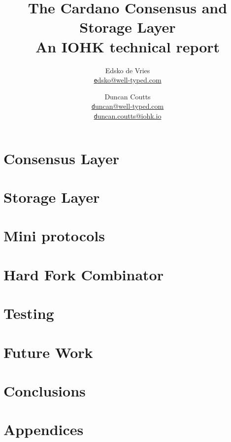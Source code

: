 \documentclass[11pt,a4paper]{report}
\title{The Cardano Consensus and Storage Layer \\
       {\large \sc An IOHK technical report}
  }
\author{Edsko de Vries \\ \href{mailto:edsko@well-typed.com}
                               {\small \texttt edsko@well-typed.com}
   \and Duncan Coutts  \\ \href{mailto:duncan@well-typed.com}
                               {\small \texttt duncan@well-typed.com}
                       \\ \href{mailto:duncan.coutts@iohk.io}
                               {\small \texttt duncan.coutts@iohk.io}
  }
\theoremstyle{definition}
\numberwithin{property}{chapter}
\numberwithin{definition}{chapter}
\numberwithin{lemma}{chapter}
\numberwithin{assumption}{chapter}
\numberwithin{corollary}{chapter}
\numberwithin{proposal}{chapter}
\begin{document}
\maketitle

\tableofcontents





\part{Consensus Layer}




\part{Storage Layer}









\part{Mini protocols}




\part{Hard Fork Combinator}





\part{Testing}




\part{Future Work}






\part{Conclusions}




\part{Appendices}
\appendix






\end{document}
